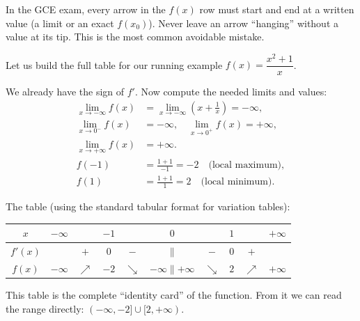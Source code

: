 \documentclass[11pt]{article}
\begin{document}
\begin{aretenir}
In the GCE exam, every arrow in the \(f(x)\) row must start and end at a written value (a limit or an exact \(f(x_0)\)). Never leave an arrow “hanging” without a value at its tip. This is the most common avoidable mistake.
\end{aretenir}

Let us build the full table for our running example \(f(x)=\dfrac{x^2+1}{x}\).

\begin{exemplebox}[Complete table of variations for \(f(x)=\dfrac{x^2+1}{x}\)]
We already have the sign of \(f'\). Now compute the needed limits and values:
\begin{align*}
\lim_{x\to-\infty} f(x) &= \lim_{x\to-\infty} \left(x+\frac{1}{x}\right) = -\infty,\\
\lim_{x\to 0^-} f(x) &= -\infty,\quad \lim_{x\to 0^+} f(x) = +\infty,\\
\lim_{x\to+\infty} f(x) &= +\infty.\\
f(-1) &= \frac{1+1}{-1} = -2 \quad\text{(local maximum)},\\
f(1) &= \frac{1+1}{1} = 2 \quad\text{(local minimum)}.
\end{align*}

The table (using the standard tabular format for variation tables):
\begin{center}
\begin{tabular}{|c|ccccccccc|}\hline
\(x\) & \(-\infty\) & & \(-1\) & & \(0\) & & \(1\) & & \(+\infty\) \\ \hline
\(f'(x)\) & & \(+\) & \(0\) & \(-\) & \(\parallel\) & \(-\) & \(0\) & \(+\) & \\ \hline
\(f(x)\) & \(-\infty\) & \(\nearrow\) & \(-2\) & \(\searrow\) & \(-\infty\parallel+\infty\) & \(\searrow\) & \(2\) & \(\nearrow\) & \(+\infty\) \\ \hline
\end{tabular}
\end{center}

This table is the complete “identity card” of the function. From it we can read the range directly: \((-\infty,-2] \cup [2,+\infty)\).
\end{exemplebox}
\end{document}
